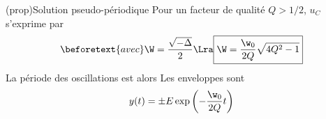 \documentclass[../../main/main.tex]{subfiles}
\begin{document}
\begin{tcb*}[label=prop:solupseudoper, sidebyside, righthand ratio=.3]
	(prop){Solution pseudo-périodique}
	Pour un facteur de qualité $Q > 1/2$, $u_C$ s'exprime par
	\vspace{-15pt}
	\begin{gather*}
		\beforetext{avec}
		\W = \frac{\sqrt{-\Delta}}{2}
		\Lra
		\boxed{\W = \frac{\w_0}{2Q} \sqrt{4Q^2 - 1}}
	\end{gather*}
	La période des oscillations est alors
	\tcblower
	Les enveloppes sont
	\[y(t) = \pm E \exp \left( - \frac{\w_0}{2Q}t \right)\]
	\begin{center}
\end{center}
\end{tcb*}
\end{document}
